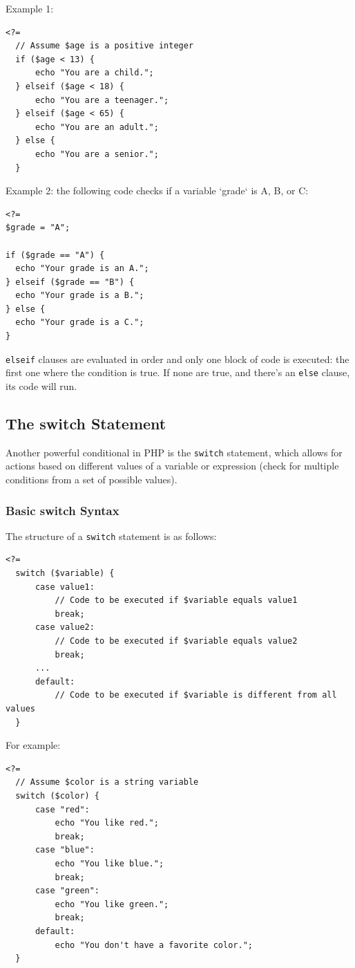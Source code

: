 \documentclass[11pt]{article}
\begin{document}
Example 1:
\begin{verbatim}
<?=
  // Assume $age is a positive integer
  if ($age < 13) {
      echo "You are a child.";
  } elseif ($age < 18) {
      echo "You are a teenager.";
  } elseif ($age < 65) {
      echo "You are an adult.";
  } else {
      echo "You are a senior.";
  }
\end{verbatim}

Example 2:
the following code checks if a variable `grade` is A, B, or C:
\begin{verbatim}
<?=
$grade = "A";

if ($grade == "A") {
  echo "Your grade is an A.";
} elseif ($grade == "B") {
  echo "Your grade is a B.";
} else {
  echo "Your grade is a C.";
}
\end{verbatim}

\texttt{elseif} clauses are evaluated in order and only one block of code is
executed: the first one where the condition is true. If none are true,
and there's an \texttt{else} clause, its code will run.


\subsection{The switch Statement}
\label{sec:org0d53632}
Another powerful conditional in PHP is the \texttt{switch} statement, which
allows for actions based on different values of a variable or
expression (check for multiple conditions from a set of possible
values).

\subsubsection{Basic switch Syntax}
\label{sec:orge7663ad}
The structure of a \texttt{switch} statement is as follows:

\begin{verbatim}
<?=
  switch ($variable) {
      case value1:
          // Code to be executed if $variable equals value1
          break;
      case value2:
          // Code to be executed if $variable equals value2
          break;
      ...
      default:
          // Code to be executed if $variable is different from all values
  }
\end{verbatim}

For example:

\begin{verbatim}
<?=
  // Assume $color is a string variable
  switch ($color) {
      case "red":
          echo "You like red.";
          break;
      case "blue":
          echo "You like blue.";
          break;
      case "green":
          echo "You like green.";
          break;
      default:
          echo "You don't have a favorite color.";
  }
\end{verbatim}
\end{document}
